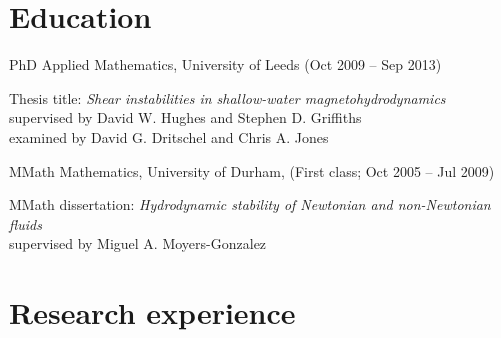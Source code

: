 \documentclass[letterpaper]{article}
\renewenvironment{itemize}{
  \begin{list}{}{
    \setlength{\leftmargin}{1.5em}
  }
}{
  \end{list}
}
\begin{document}
\section*{Education}
\begin{itemize}

\item PhD Applied Mathematics, University of Leeds (Oct 2009 -- Sep 2013)
\begin{itemize}
	\item[--] Thesis title: \textit{Shear instabilities in shallow-water
	magnetohydrodynamics}\\
	supervised by David W. Hughes and Stephen D. Griffiths\\
	examined by David G. Dritschel and Chris A. Jones
\end{itemize}
 \item MMath Mathematics, University of Durham, (First class; Oct 2005 -- Jul 2009)
\begin{itemize}
  	\item[--] MMath dissertation: \textit{Hydrodynamic stability of Newtonian
  	and non-Newtonian fluids}\\
  	supervised by Miguel A. Moyers-Gonzalez
\end{itemize}
\end{itemize}


\section*{Research experience}
\end{document}
